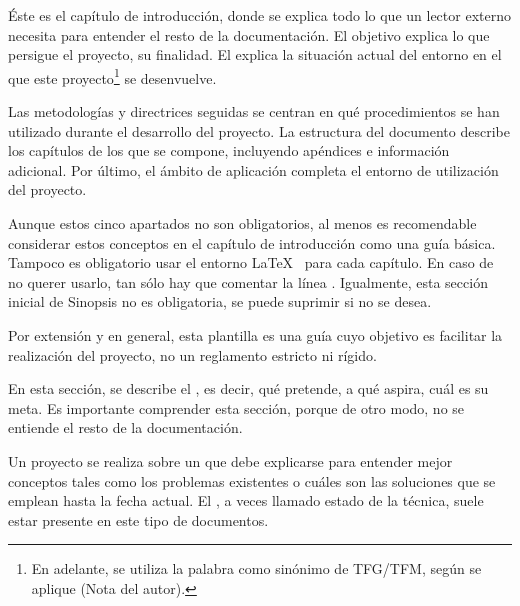 
\minitoc

\begin{sinopsis}
\label{sec:intro:sinop}

Éste es el capítulo de introducción, donde se explica todo lo que un lector externo necesita para entender el resto de la documentación. El objetivo explica lo que persigue el proyecto, su finalidad.	El  explica la situación actual del entorno en el que este proyecto\footnote{En adelante, se utiliza la palabra  como sinónimo de TFG/TFM, según se aplique (Nota del autor).} se desenvuelve.

Las metodologías y directrices seguidas se centran en qué procedimientos se han utilizado durante el desarrollo del proyecto. La estructura del documento describe los capítulos de los que se compone, incluyendo apéndices e información adicional. Por último, el ámbito de aplicación completa el entorno de utilización del proyecto.

Aunque estos cinco apartados no son obligatorios, al menos es recomendable considerar estos conceptos en el capítulo de introducción como una guía básica. Tampoco es obligatorio usar el entorno \LaTeX\  para cada capítulo. En caso de no querer usarlo, tan sólo hay que comentar la línea . Igualmente, esta sección inicial de Sinopsis no es obligatoria, se puede suprimir si no se desea.

Por extensión y en general, esta plantilla es una guía cuyo objetivo es facilitar la realización del proyecto, no un reglamento estricto ni rígido.
\end{sinopsis}

\label{sec:intro:obj}
En esta sección, se describe el , es decir, qué pretende, a qué aspira, cuál es su meta. Es importante comprender esta sección, porque de otro modo, no se entiende el resto de la documentación.


Un proyecto se realiza sobre un  que debe explicarse para entender mejor conceptos tales como los problemas existentes o cuáles son las soluciones que se emplean hasta la fecha actual. El , a veces llamado estado de la técnica, suele estar presente en este tipo de documentos.

